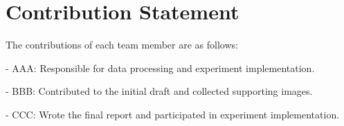 \section{Contribution Statement}
\label{sec:contribution-statement}
The contributions of each team member are as follows:
    
- AAA: Responsible for data processing and experiment implementation.
    
- BBB: Contributed to the initial draft and collected supporting images.
    
- CCC: Wrote the final report and participated in experiment implementation.